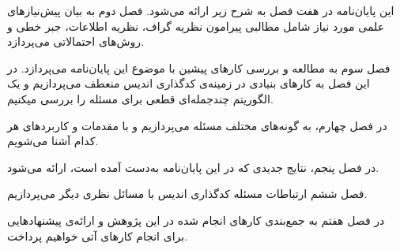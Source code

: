 این پایان‌نامه در هفت فصل به شرح زیر ارائه می‌شود.
فصل دوم به بیان پیش‌نیازهای علمی مورد نیاز شامل مطالبی پیرامون نظریه گراف، نظریه اطلاعات، جبر خطی و روش‌های احتمالاتی  می‌پردازد.

فصل سوم به مطالعه و بررسی کارهای پیشین با موضوع این پایان‌نامه می‌پردازد. در این فصل به کارهای بنیادی 
در زمینه‌ی کدگذاری اندیس منعطف می‌پردازیم و یک الگوریتم چندجمله‌ای قطعی برای مسئله را بررسی میکنیم.

در فصل چهارم، به گونه‌های مختلف مسئله می‌پردازیم و با مقدمات و کاربردهای هر کدام آشنا می‌شویم.

در فصل پنجم، نتایج جدیدی که در این پایان‌نامه به‌دست آمده است، ارائه می‌شود.

فصل ششم ارتباطات مسئله کدگذاری اندیس با مسائل نظری دیگر می‌پردازیم.

در فصل هفتم به جمع‌بندی کارهای انجام شده در این پژوهش و ارائه‌ی پیشنهادهایی برای انجام کارهای آتی خواهیم پرداخت.